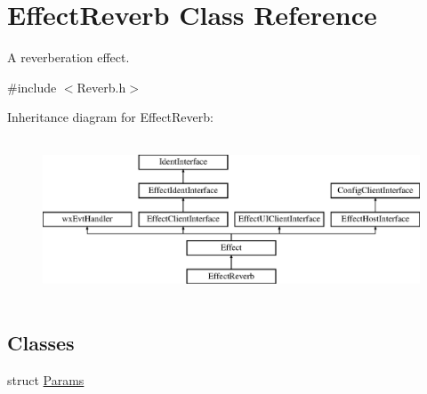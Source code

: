 \hypertarget{class_effect_reverb}{}\section{Effect\+Reverb Class Reference}
\label{class_effect_reverb}


A reverberation effect.  




{\ttfamily \#include $<$Reverb.\+h$>$}

Inheritance diagram for Effect\+Reverb\+:\begin{figure}[H]
\begin{center}
\leavevmode
\includegraphics[height=4.794520cm]{class_effect_reverb}
\end{center}
\end{figure}
\subsection*{Classes}
\begin{DoxyCompactItemize}
\item 
struct \hyperlink{struct_effect_reverb_1_1_params}{Params}
\end{DoxyCompactItemize}
